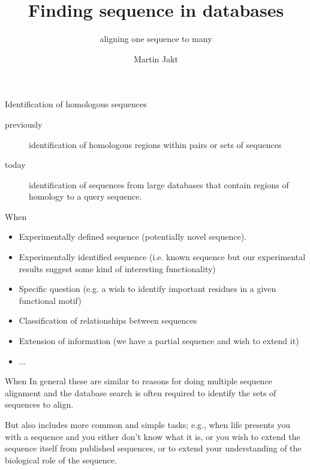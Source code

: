 \documentclass[pdf]{beamer}
\title{Finding sequence in databases}
\subtitle{aligning one sequence to many}
\author{Martin Jakt}
\begin{document}
\begin{frame}
\titlepage
\end{frame}

\begin{frame}{Identification of homologous sequences}
\begin{description}
\item[previously] identification of homologous regions within pairs or sets of
  sequences
\item[today] identification of sequences from large databases that contain
  regions of homology to a query sequence.
\end{description}
\end{frame}

\begin{frame}{When}
  \begin{itemize}
  \item Experimentally defined sequence (potentially novel
    sequence).
  \item Experimentally identified sequence (i.e. known sequence but our
    experimental results suggest some kind of interesting functionality)
  \item Specific question (e.g. a wish to identify important residues in a
    given functional motif)
  \item Classification of relationships between sequences
  \item Extension of information (we have a partial sequence and wish to
    extend it)
  \item ...
  \end{itemize}
\end{frame}

\begin{frame}{When}
In general these are similar to reasons for doing multiple sequence alignment
and the database search is often required to identify the sets of sequences to
align.

But also includes more common and simple tasks; e.g., when life presents you with a
sequence and you either don't know what it is, or you wish to extend the
sequence itself from published sequences, or to extend your understanding of
the biological role of the sequence.
\end{frame}
\end{document}
